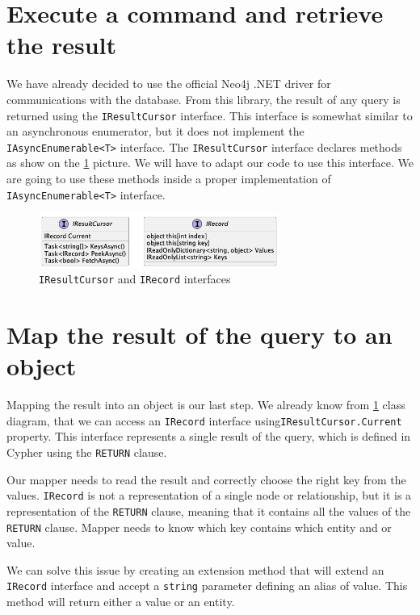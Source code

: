 \section{Execute a command and retrieve the result}

We have already decided to use the official Neo4j .NET driver for communications with the database.
From this library, the result of any query is returned using the \texttt{IResultCursor} interface.
This interface is somewhat similar to an asynchronous enumerator, but it does not implement the \texttt{IAsyncEnumerable<T>} interface.
The \texttt{IResultCursor} interface declares methods as show on the \ref{fig:iresinterface} picture. We will have to adapt our code to use this interface.
We are going to use these methods inside a proper implementation of \texttt{IAsyncEnumerable<T>} interface.

\begin{figure}[H]
	\centering
	\includegraphics[width=0.7\textwidth]{content/IResultCursor.png}
	\caption{\texttt{IResultCursor} and \texttt{IRecord} interfaces}
	\label{fig:iresinterface}
\end{figure}

\section{Map the result of the query to an object}

Mapping the result into an object is our last step.
We already know from \ref{fig:iresinterface} class diagram, that we can access an \texttt{IRecord} interface using\linebreak \texttt{IResultCursor.Current} property.
This interface represents a single result of the query, which is defined in Cypher using the \texttt{RETURN} clause.

Our mapper needs to read the result and correctly choose the right key from the values.
\texttt{IRecord} is not a representation of a single node or relationship, but it is a representation of the \texttt{RETURN} clause, meaning that it contains all the values of the \texttt{RETURN} clause.
Mapper needs to know which key contains which entity and or value.

We can solve this issue by creating an extension method that will extend an \texttt{IRecord} interface and accept a \texttt{string} parameter defining an alias of value.
This method will return either a value or an entity.

